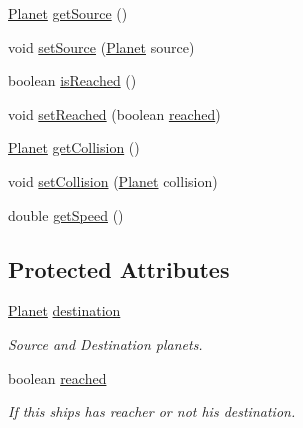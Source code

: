 \begin{DoxyCompactItemize}
\item 
\hyperlink{classfr_1_1groupe40_1_1projet_1_1model_1_1planets_1_1_planet}{Planet} \hyperlink{classfr_1_1groupe40_1_1projet_1_1model_1_1ships_1_1_ship_a0bad8c1701c7a6bee319ae8671228d6f}{get\+Source} ()
\item 
void \hyperlink{classfr_1_1groupe40_1_1projet_1_1model_1_1ships_1_1_ship_aa48b0a9238306da4fcc27a37dfc50829}{set\+Source} (\hyperlink{classfr_1_1groupe40_1_1projet_1_1model_1_1planets_1_1_planet}{Planet} source)
\item 
boolean \hyperlink{classfr_1_1groupe40_1_1projet_1_1model_1_1ships_1_1_ship_a81d13eda5cf767c710e6d82407172d47}{is\+Reached} ()
\item 
void \hyperlink{classfr_1_1groupe40_1_1projet_1_1model_1_1ships_1_1_ship_a5a3e2ba94e01cce27b168365e53e0cde}{set\+Reached} (boolean \hyperlink{classfr_1_1groupe40_1_1projet_1_1model_1_1ships_1_1_ship_abd5ae4da4bce134894098a111d7378c3}{reached})
\item 
\hyperlink{classfr_1_1groupe40_1_1projet_1_1model_1_1planets_1_1_planet}{Planet} \hyperlink{classfr_1_1groupe40_1_1projet_1_1model_1_1ships_1_1_ship_a7fb131bafd7937973eecd26870796dd8}{get\+Collision} ()
\item 
void \hyperlink{classfr_1_1groupe40_1_1projet_1_1model_1_1ships_1_1_ship_aad6f47714d9aa1e212ce9ee5e1a8d22a}{set\+Collision} (\hyperlink{classfr_1_1groupe40_1_1projet_1_1model_1_1planets_1_1_planet}{Planet} collision)
\item 
double \hyperlink{classfr_1_1groupe40_1_1projet_1_1model_1_1ships_1_1_ship_aae0aceeef0cac73a3c384324e9d8b867}{get\+Speed} ()
\end{DoxyCompactItemize}
\subsection*{Protected Attributes}
\begin{DoxyCompactItemize}
\item 
\mbox{\label{classfr_1_1groupe40_1_1projet_1_1model_1_1ships_1_1_ship_a19eb504f8a0c0e263aff1e85e5e7557a}} 
\hyperlink{classfr_1_1groupe40_1_1projet_1_1model_1_1planets_1_1_planet}{Planet} \hyperlink{classfr_1_1groupe40_1_1projet_1_1model_1_1ships_1_1_ship_a19eb504f8a0c0e263aff1e85e5e7557a}{destination}
\begin{DoxyCompactList}\small\item\em Source and Destination planets. \end{DoxyCompactList}\item 
\mbox{\label{classfr_1_1groupe40_1_1projet_1_1model_1_1ships_1_1_ship_abd5ae4da4bce134894098a111d7378c3}} 
boolean \hyperlink{classfr_1_1groupe40_1_1projet_1_1model_1_1ships_1_1_ship_abd5ae4da4bce134894098a111d7378c3}{reached}
\begin{DoxyCompactList}\small\item\em If this ships has reacher or not his destination. \end{DoxyCompactList}\end{DoxyCompactItemize}


